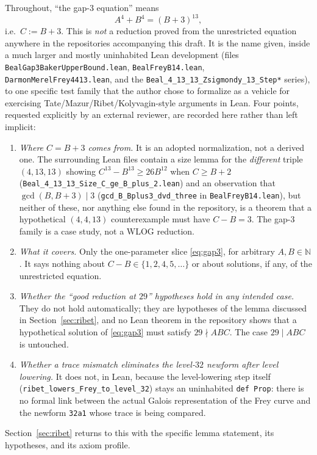Throughout, ``the gap-3 equation'' means
\begin{equation}\label{eq:gap3}
  A^4+B^4=(B+3)^{13},
\end{equation}
i.e.\ $C:=B+3$. This is \emph{not} a reduction proved from the
unrestricted equation anywhere in the repositories accompanying
this draft. It is the name given, inside a much larger and mostly
uninhabited Lean development (files
\texttt{BealGap3BakerUpperBound.lean}, \texttt{BealFreyB14.lean},
\texttt{DarmonMerelFrey4413.lean}, and the
\texttt{Beal\_4\_13\_13\_Zsigmondy\_13\_Step*} series), to one
specific test family that the author chose to formalize as a
vehicle for exercising Tate/Mazur/Ribet/Kolyvagin-style arguments
in Lean. Four points, requested explicitly by an external
reviewer, are recorded here rather than left implicit:
\begin{enumerate}
\item \emph{Where $C=B+3$ comes from.} It is an adopted
  normalization, not a derived one. The surrounding Lean files
  contain a size lemma for the \emph{different} triple $(4,13,13)$
  showing $C^{13}-B^{13}\ge 26B^{12}$ when $C\ge B+2$
  (\texttt{Beal\_4\_13\_13\_Size\_C\_ge\_B\_plus\_2.lean}) and an
  observation that $\gcd(B,B+3)\mid 3$
  (\texttt{gcd\_B\_Bplus3\_dvd\_three} in
  \texttt{BealFreyB14.lean}), but neither of these, nor anything
  else found in the repository, is a theorem that a hypothetical
  $(4,4,13)$ counterexample must have $C-B=3$. The gap-3 family is
  a case study, not a WLOG reduction.
\item \emph{What it covers.} Only the one-parameter slice
  \eqref{eq:gap3}, for arbitrary $A,B\in\mathbb N$. It says nothing
  about $C-B\in\{1,2,4,5,\dots\}$ or about solutions, if any, of the
  unrestricted equation.
\item \emph{Whether the ``good reduction at $29$'' hypotheses hold
  in any intended case.} They do not hold automatically; they are
  hypotheses of the lemma discussed in
  Section~\ref{sec:ribet}, and no Lean theorem in the repository
  shows that a hypothetical solution of \eqref{eq:gap3} must
  satisfy $29\nmid ABC$. The case $29\mid ABC$ is untouched.
\item \emph{Whether a trace mismatch eliminates the level-$32$
  newform after level lowering.} It does not, in Lean, because the
  level-lowering step itself
  (\texttt{ribet\_lowers\_Frey\_to\_level\_32}) stays an uninhabited
  \texttt{def Prop}: there is no formal link between the actual
  Galois representation of the Frey curve and the newform
  \texttt{32a1} whose trace is being compared.
\end{enumerate}
Section~\ref{sec:ribet} returns to this with the specific lemma
statement, its hypotheses, and its axiom profile.

